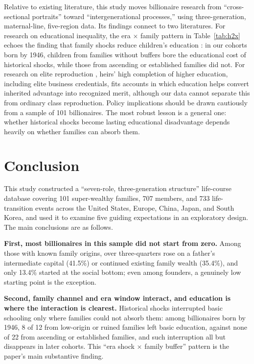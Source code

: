 \documentclass[11pt,a4paper]{article}
\begin{document}
Relative to existing literature, this study moves billionaire research from ``cross-sectional portraits'' toward ``intergenerational processes,'' using three-generation, maternal-line, five-region data. Its findings connect to two literatures. For research on educational inequality, the era $\times$ family pattern in Table~\ref{tab:h2x} echoes the finding that family shocks reduce children's education \citep{sato2024}: in our cohorts born by 1946, children from families without buffers bore the educational cost of historical shocks, while those from ascending or established families did not. For research on elite reproduction \citep{bourdieu1986,collins1979,lillie2025}, heirs' high completion of higher education, including elite business credentials, fits accounts in which education helps convert inherited advantage into recognized merit, although our data cannot separate this from ordinary class reproduction. Policy implications should be drawn cautiously from a sample of 101 billionaires. The most robust lesson is a general one: whether historical shocks become lasting educational disadvantage depends heavily on whether families can absorb them.

\section{Conclusion}
\label{sec:conclusion}

This study constructed a ``seven-role, three-generation structure'' life-course database covering 101 super-wealthy families, 707 members, and 733 life-transition events across the United States, Europe, China, Japan, and South Korea, and used it to examine five guiding expectations in an exploratory design. The main conclusions are as follows.

\textbf{First, most billionaires in this sample did not start from zero.} Among those with known family origins, over three-quarters rose on a father's intermediate capital (41.5\%) or continued existing family wealth (35.4\%), and only 13.4\% started at the social bottom; even among founders, a genuinely low starting point is the exception.

\textbf{Second, family channel and era window interact, and education is where the interaction is clearest.} Historical shocks interrupted basic schooling only where families could not absorb them: among billionaires born by 1946, 8 of 12 from low-origin or ruined families left basic education, against none of 22 from ascending or established families, and such interruption all but disappears in later cohorts. This ``era shock $\times$ family buffer'' pattern is the paper's main substantive finding.
\end{document}
